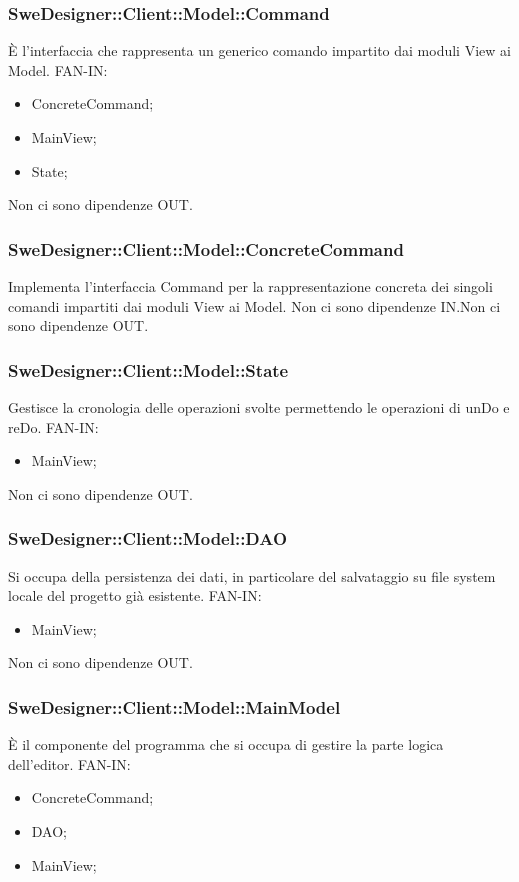 \documentclass[../PianoDiQualifica.tex]{subfiles}
\begin{document}
		\subsubsection{SweDesigner::Client::Model::Command}
		È l'interfaccia che rappresenta un generico comando impartito dai moduli View ai Model.
		FAN-IN:
		\begin{itemize}
			\item ConcreteCommand;
			\item MainView;
			\item State;
		\end{itemize}
		Non ci sono dipendenze OUT.\subsubsection{SweDesigner::Client::Model::ConcreteCommand}
		Implementa l'interfaccia Command per la rappresentazione concreta dei singoli comandi impartiti dai moduli View ai Model.
		Non ci sono dipendenze IN.Non ci sono dipendenze OUT.\subsubsection{SweDesigner::Client::Model::State}
		Gestisce la cronologia delle operazioni svolte permettendo le operazioni di unDo e reDo.
		FAN-IN:
		\begin{itemize}
			\item MainView;
		\end{itemize}
		Non ci sono dipendenze OUT.\subsubsection{SweDesigner::Client::Model::DAO}
		Si occupa della persistenza dei dati, in particolare del salvataggio su file system locale del progetto già esistente.
		FAN-IN:
		\begin{itemize}
			\item MainView;
		\end{itemize}
		Non ci sono dipendenze OUT.\subsubsection{SweDesigner::Client::Model::MainModel}
		È il componente del programma che si occupa di gestire la parte logica dell’editor.
		FAN-IN:
		\begin{itemize}
			\item ConcreteCommand;
			\item DAO;
			\item MainView;
		\end{itemize}
\end{document}
